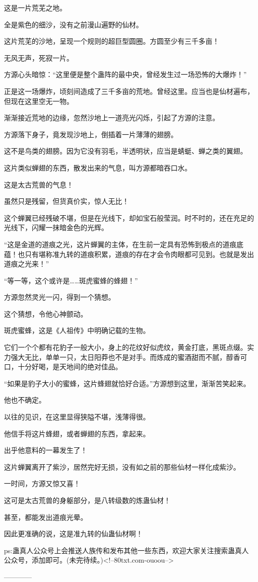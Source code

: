 \begin{this_body}
这是一片荒芜之地。

全是紫色的细沙，没有之前漫山遍野的仙材。

这片荒芜的沙地，呈现一个规则的超巨型圆圈。方圆至少有三千多亩！

无风无声，死寂一片。

方源心头暗惊：“这里便是整个蛊阵的最中央，曾经发生过一场恐怖的大爆炸！”

正是这一场爆炸，顷刻间造成了三千多亩的荒地。曾经这里。应当也是仙材遍布，但现在这里空无一物。

渐渐接近荒地的边缘，忽然沙地上一道亮光闪烁，引起了方源的注意。

方源落下身子，竟发现沙地上，倒插着一片薄薄的翅膀。

这不是鸟类的翅膀。因为它没有羽毛，半透明状，应当是蜻蜓、蝉之类的翼翅。

这片类似蝉翅的东西，散发出来的气息，叫方源都暗吞口水。

这是太古荒兽的气息！

虽然只是残留，但货真价实，惊人无比！

这个蝉翼已经残破不堪，但是在光线下，却如宝石般莹润。时不时的，还在充足的光线下，闪耀一抹暗金色的光辉。

“这是金道的道痕之光，这片蝉翼的主体，在生前一定具有恐怖到极点的道痕底蕴！也只有堪称准九转的道痕积累，道痕的存在才会令肉眼都可见到。也就是发出道痕之光来！”

“等一等，这个或许是……斑虎蜜蜂的蜂翅！”

方源忽然灵光一闪，得到一个猜想。

这个猜想，令他心神颤动。

斑虎蜜蜂，这是《人祖传》中明确记载的生物。

它们一个个都有花豹子一般大小，身上的花纹好似虎纹，黄金打底，黑斑点缀。实力强大无比，单单一只，太日阳莽也不是对手。而炼成的蜜酒甜而不腻，醇香可口，十分好喝，是天地间的绝对佳品。

“如果是豹子大小的蜜蜂，这片蜂翅就恰好合适。”方源想到这里，渐渐苦笑起来。

他也不确定。

以往的见识，在这里显得狭隘不堪，浅薄得很。

他信手将这片蜂翅，或者蝉翅的东西，拿起来。

出乎他意料的一幕发生了！

这片蝉翼离开了紫沙，居然完好无损，没有如之前的那些仙材一样化成紫沙。

一时间，方源又惊又喜！

这可是太古荒兽的身躯部分，是八转级数的炼蛊仙材！

甚至，都能发出道痕光晕。

因此更准确的说，这是准九转的仙蛊仙材啊！

ps:蛊真人公众号上会推送人族传和发布其他一些东西，欢迎大家关注搜索蛊真人公众号，添加即可。(未完待续。)<!--80txt.com-ouoou-->

------------

\end{this_body}

